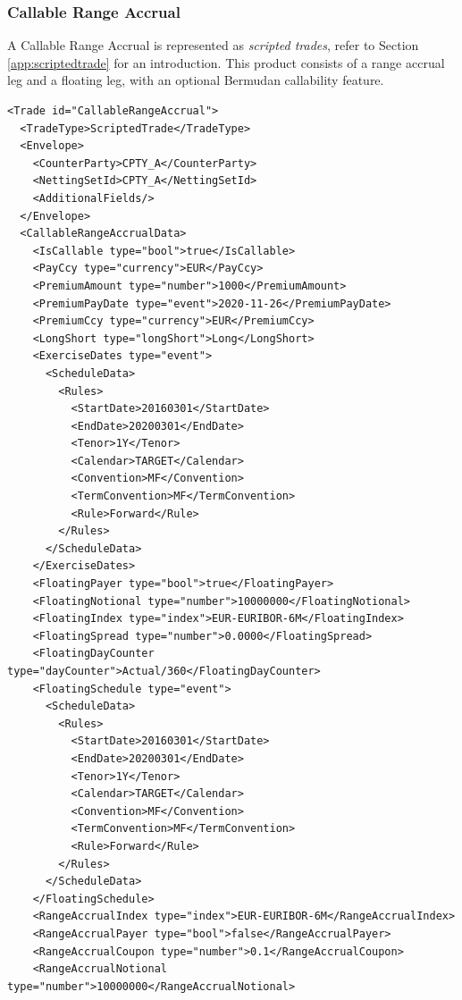 \subsubsection{Callable Range Accrual}


A Callable Range Accrual is represented as {\em scripted trades}, refer to Section
\ref{app:scriptedtrade} for an introduction. This product consists of a range accrual leg and a floating
leg, with an optional Bermudan callability feature.

\begin{verbatim}
<Trade id="CallableRangeAccrual">
  <TradeType>ScriptedTrade</TradeType>
  <Envelope>
    <CounterParty>CPTY_A</CounterParty>
    <NettingSetId>CPTY_A</NettingSetId>
    <AdditionalFields/>
  </Envelope>
  <CallableRangeAccrualData>
    <IsCallable type="bool">true</IsCallable>
    <PayCcy type="currency">EUR</PayCcy>
    <PremiumAmount type="number">1000</PremiumAmount>
    <PremiumPayDate type="event">2020-11-26</PremiumPayDate>
    <PremiumCcy type="currency">EUR</PremiumCcy>
    <LongShort type="longShort">Long</LongShort>
    <ExerciseDates type="event">
      <ScheduleData>
        <Rules>
          <StartDate>20160301</StartDate>
          <EndDate>20200301</EndDate>
          <Tenor>1Y</Tenor>
          <Calendar>TARGET</Calendar>
          <Convention>MF</Convention>
          <TermConvention>MF</TermConvention>
          <Rule>Forward</Rule>
        </Rules>
      </ScheduleData>
    </ExerciseDates>
    <FloatingPayer type="bool">true</FloatingPayer>
    <FloatingNotional type="number">10000000</FloatingNotional>
    <FloatingIndex type="index">EUR-EURIBOR-6M</FloatingIndex>
    <FloatingSpread type="number">0.0000</FloatingSpread>
    <FloatingDayCounter type="dayCounter">Actual/360</FloatingDayCounter>
    <FloatingSchedule type="event">
      <ScheduleData>
        <Rules>
          <StartDate>20160301</StartDate>
          <EndDate>20200301</EndDate>
          <Tenor>1Y</Tenor>
          <Calendar>TARGET</Calendar>
          <Convention>MF</Convention>
          <TermConvention>MF</TermConvention>
          <Rule>Forward</Rule>
        </Rules>
      </ScheduleData>
    </FloatingSchedule>
    <RangeAccrualIndex type="index">EUR-EURIBOR-6M</RangeAccrualIndex>
    <RangeAccrualPayer type="bool">false</RangeAccrualPayer>
    <RangeAccrualCoupon type="number">0.1</RangeAccrualCoupon>
    <RangeAccrualNotional type="number">10000000</RangeAccrualNotional>

\end{verbatim}
